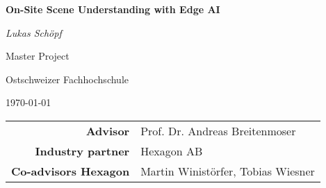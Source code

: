 %
%
%


\begin{titlepage}
    \centering

    {\huge \bfseries \sffamily On-Site Scene Understanding with Edge AI \par
     }
    \vspace{1cm}

    {\large \textsl{Lukas Schöpf}}
    \par
    \vspace{1cm}

    {\textsc Master Project \par}
    {Ostschweizer Fachhochschule \par}
    \today
    \vfill
    

    \vfill

    \begin{tabular}{rl}
        \bfseries\sffamily Advisor              & Prof. Dr. Andreas Breitenmoser \\
        \bfseries\sffamily Industry partner     & Hexagon AB \\
        \bfseries\sffamily Co-advisors Hexagon   & Martin Winistörfer, Tobias Wiesner \\
    \end{tabular}
    \restoregeometry    
\end{titlepage}

